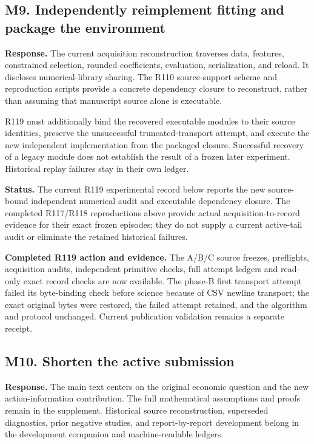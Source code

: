 \hypertarget{m9.-independently-reimplement-fitting-and-package-the-environment}{%
\subsection{M9. Independently reimplement fitting and package the environment}\label{m9.-independently-reimplement-fitting-and-package-the-environment}}

\textbf{Response.} The current acquisition reconstruction traverses data, features, constrained selection, rounded coefficients, evaluation, serialization, and reload. It discloses numerical-library sharing. The R110 source-support scheme and reproduction scripts provide a concrete dependency closure to reconstruct, rather than assuming that manuscript source alone is executable.

R119 must additionally bind the recovered executable modules to their source identities, preserve the unsuccessful truncated-transport attempt, and execute the new independent implementation from the packaged closure. Successful recovery of a legacy module does not establish the result of a frozen later experiment. Historical replay failures stay in their own ledger.

\textbf{Status.} The current R119 experimental record below reports the new source-bound independent numerical audit and executable dependency closure. The completed R117/R118 reproductions above provide actual acquisition-to-record evidence for their exact frozen episodes; they do not supply a current active-tail audit or eliminate the retained historical failures.

\textbf{Completed R119 action and evidence.} The A/B/C source freezes, preflights, acquisition audits, independent primitive checks, full attempt ledgers and read-only exact record checks are now available. The phase-B first transport attempt failed its byte-binding check before science because of CSV newline transport; the exact original bytes were restored, the failed attempt retained, and the algorithm and protocol unchanged. Current publication validation remains a separate receipt.

\hypertarget{m10.-shorten-the-active-submission}{%
\subsection{M10. Shorten the active submission}\label{m10.-shorten-the-active-submission}}

\textbf{Response.} The main text centers on the original economic question and the new action-information contribution. The full mathematical assumptions and proofs remain in the supplement. Historical source reconstruction, superseded diagnostics, prior negative studies, and report-by-report development belong in the development companion and machine-readable ledgers.

